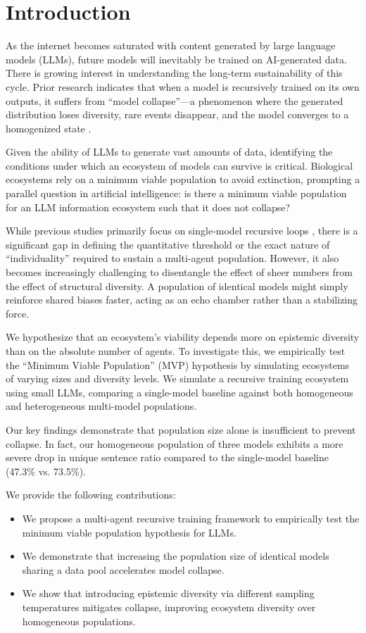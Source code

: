 \section{Introduction}
\label{sec:intro}

As the internet becomes saturated with content generated by large language models (LLMs), future models will inevitably be trained on AI-generated data. There is growing interest in understanding the long-term sustainability of this cycle. Prior research indicates that when a model is recursively trained on its own outputs, it suffers from ``model collapse''---a phenomenon where the generated distribution loses diversity, rare events disappear, and the model converges to a homogenized state \cite{shumailov2024ai}.

Given the ability of LLMs to generate vast amounts of data, identifying the conditions under which an ecosystem of models can survive is critical. Biological ecosystems rely on a minimum viable population to avoid extinction, prompting a parallel question in artificial intelligence: is there a minimum viable population for an LLM information ecosystem such that it does not collapse?

While previous studies primarily focus on single-model recursive loops \cite{shumailov2024ai}, there is a significant gap in defining the quantitative threshold or the exact nature of ``individuality'' required to sustain a multi-agent population. However, it also becomes increasingly challenging to disentangle the effect of sheer numbers from the effect of structural diversity. A population of identical models might simply reinforce shared biases faster, acting as an echo chamber rather than a stabilizing force.

We hypothesize that an ecosystem's viability depends more on epistemic diversity than on the absolute number of agents. To investigate this, we empirically test the ``Minimum Viable Population'' (MVP) hypothesis by simulating ecosystems of varying sizes and diversity levels. We simulate a recursive training ecosystem using small LLMs, comparing a single-model baseline against both homogeneous and heterogeneous multi-model populations.

Our key findings demonstrate that population size alone is insufficient to prevent collapse. In fact, our homogeneous population of three models exhibits a more severe drop in unique sentence ratio compared to the single-model baseline (47.3\% vs. 73.5\%).

We provide the following contributions:
\begin{itemize}[leftmargin=*,itemsep=0pt,topsep=0pt]
    \item We propose a multi-agent recursive training framework to empirically test the minimum viable population hypothesis for LLMs.
    \item We demonstrate that increasing the population size of identical models sharing a data pool accelerates model collapse.
    \item We show that introducing epistemic diversity via different sampling temperatures mitigates collapse, improving ecosystem diversity over homogeneous populations.
\end{itemize}
